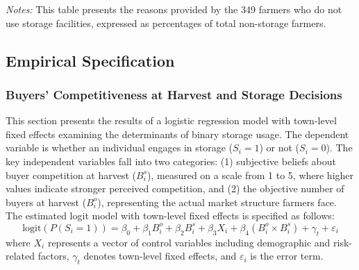 \documentclass[12pt]{article}
\begin{document}
\begin{table}[H]
    \centering
    \footnotesize
    \caption{Reasons for Not Using Storage Facilities}
    \label{tab:non_storage_reasons}
        \begin{tablenotes}
            \item \textit{Notes:} This table presents the reasons provided by the 349 farmers who do not use storage facilities, expressed as percentages of total non-storage farmers.
        \end{tablenotes}
\end{table}


\newpage
\subsection{Empirical Specification}

\subsubsection{Buyers' Competitiveness at Harvest and Storage Decisions}
This section presents the results of a logistic regression model with town-level fixed effects examining the determinants of binary storage usage. The dependent variable is whether an individual engages in storage ($S_i = 1$) or not ($S_i = 0$). The key independent variables fall into two categories: (1) subjective beliefs about buyer competition at harvest ($B^s_i$), measured on a scale from 1 to 5, where higher values indicate stronger perceived competition, and (2) the objective number of buyers at harvest ($B^o_i$), representing the actual market structure farmers face. The estimated logit model with town-level fixed effects is specified as follows:
\begin{equation}
\text{logit} \left( P(S_i = 1) \right) = \beta_0 + \beta_1 B^o_i + \beta_2 B^s_i + \beta_3 X_i + \beta_4 (B^o_i \times B^s_i) + \gamma_t + \varepsilon_i
\end{equation}
where $X_i$ represents a vector of control variables including demographic and risk-related factors, $\gamma_t$ denotes town-level fixed effects, and $\varepsilon_i$ is the error term.
\end{document}
